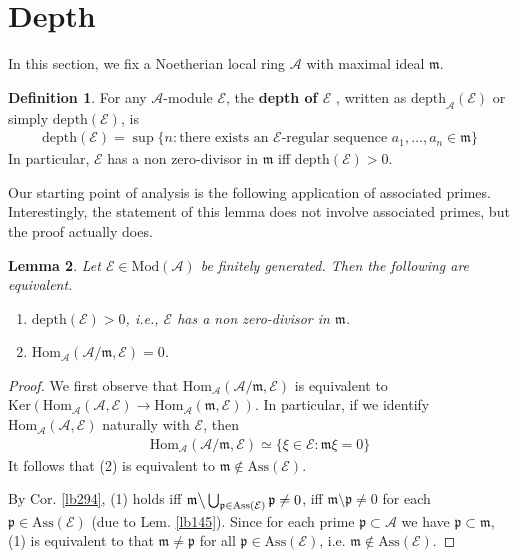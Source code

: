 \documentclass[12pt,b5paper,notitlepage]{report}
\theoremstyle{definition}
\newtheorem{df}{Definition}[section]
\theoremstyle{plain}
\newtheorem{lm}[df]{Lemma}
\newcommand{\mc}{\mathcal}
\newcommand{\Hom}{\mathrm{Hom}}
\newcommand{\pk}{\mathfrak p}
\newcommand{\Ker}{\mathrm{Ker}}
\newcommand{\Mod}{\mathrm{Mod}}
\newcommand{\mk}{\mathfrak m}
\newcommand{\Ass}{\mathrm{Ass}}
\newcommand{\depth}{\mathrm{depth}}
\numberwithin{equation}{section}
\begin{document}
\section{Depth}



In this section, we fix a Noetherian local ring $\mc A$ with maximal ideal $\mk$. 



\begin{df}
For any $\mc A$-module $\mc E$, the \textbf{depth of $\mc E$}  \index{depth@$\depth_{\mc A}(\mc E)=\depth(\mc E)$}, written as $\depth_{\mc A}(\mc E)$ or simply $\depth(\mc E)$, is 
\begin{align*}
\depth(\mc E)=\sup\{n:\text{there exists an $\mc E$-regular sequence $a_1,\dots,a_n\in\mk$} \}
\end{align*}
In particular, $\mc E$ has a non zero-divisor in $\mk$ iff $\depth(\mc E)>0$.
\end{df}




Our starting point of analysis is the following application of associated primes. Interestingly, the statement of this lemma does not involve associated primes, but the proof actually does.


\begin{lm}\label{lb296}
Let $\mc E\in\Mod(\mc A)$ be finitely generated. Then the following are equivalent.
\begin{enumerate}[label=(\arabic*)]
\item $\depth(\mc E)>0$, i.e., $\mc E$ has a non zero-divisor in $\mk$.
\item $\Hom_{\mc A}(\mc A/\mk,\mc E)=0$.
\end{enumerate}
\end{lm}


\begin{proof}
We first observe that $\Hom_{\mc A}(\mc A/\mk,\mc E)$ is equivalent to $\Ker(\Hom_{\mc A}(\mc A,\mc E)\rightarrow\Hom_{\mc A}(\mk,\mc E))$. In particular, if we identify $\Hom_{\mc A}(\mc A,\mc E)$ naturally with $\mc E$, then
\begin{align*}
\Hom_{\mc A}(\mc A/\mk,\mc E)\simeq\{\xi\in\mc E:\mk\xi=0\}
\end{align*}
It follows that (2) is equivalent to $\mk\notin\Ass(\mc E)$.

By Cor. \ref{lb294}, (1) holds iff $\mk\big\backslash\bigcup_{\pk\in\Ass(\mc E)}\pk\neq 0$, iff $\mk\setminus\pk\neq 0$ for each $\pk\in\Ass(\mc E)$ (due to Lem. \ref{lb145}). Since for each prime $\pk\subset\mc A$ we have $\pk\subset\mk$, (1) is equivalent to that $\mk\neq \pk$ for all $\pk\in\Ass(\mc E)$, i.e. $\mk\notin\Ass(\mc E)$. 
\end{proof}
\end{document}
